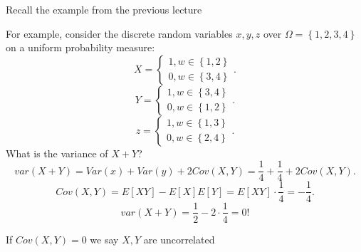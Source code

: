 \documentclass[a4paper]{article}
\begin{document}
Recall the example from the previous lecture
\begin{note}
  For example, consider the discrete random variables $x,y,z$ over $\Omega = \left\{ 1,2,3,4 \right\}$ on a uniform
  probability measure:
  \[
  X = \begin{cases}
    1, w \in \left\{ 1,2 \right\} \\
    0, w \in \left\{ 3,4 \right\} 
  \end{cases}
  .\] 
  \[
  Y = \begin{cases}
    1, w \in \left\{ 3,4 \right\} \\
    0, w \in \left\{ 1,2 \right\} 
  \end{cases}
  .\] 
  \[
  z = \begin{cases}
    1, w \in \left\{ 1,3 \right\} \\
    0, w \in \left\{ 2,4 \right\} 
  \end{cases}
  .\] 
  What is the variance of $X+Y$?
  \[
  var(X+Y) = Var(x) + Var(y) + 2 Cov(X,Y) = \frac{1}{4} + \frac{1}{4} + 2 Cov(X,Y)
  .\] 
  \[
    Cov(X,Y) = E[XY] - E[X]E[Y] = E[XY] \cdot \frac{1}{4} = -\frac{1}{4}
  .\]
  \[
  var(X+Y) = \frac{1}{2} - 2 \cdot \frac{1}{4} = 0
  !\]
\end{note}

\begin{definition}
  If $Cov(X,Y) = 0$ we say $X,Y$ are uncorrelated
\end{definition}
\end{document}
